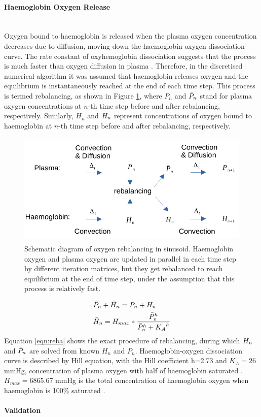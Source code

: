 \documentclass[12pt]{article}
\newcommand{\myparagraph}[1]{\paragraph{#1}\mbox{}\\}
\begin{document}
\myparagraph{Haemoglobin Oxygen Release}\label{section:haemo}
Oxygen bound to haemoglobin is released when the plasma oxygen concentration decreases due to diffusion, moving down the haemoglobin-oxygen dissociation curve. The rate constant of oxyhemoglobin dissociation suggests that the process is much faster than oxygen diffusion in plasma \cite{olsonMeasurementRateConstants2003}. Therefore, in the discretised numerical algorithm it was assumed that haemoglobin releases oxygen and the equilibrium is instantaneously reached at the end of each time step. This process is termed rebalancing, as shown in Figure \ref{fig:hemo}, where $P_n$ and $\Bar{P}_n$ stand for plasma oxygen concentrations at $n$-th time step before and after rebalancing, respectively. Similarly, $H_n$ and $\Bar{H}_n$ represent concentrations of oxygen bound to haemoglobin at $n$-th time step before and after rebalancing, respectively. 
\begin{figure}[h!]
\centering
\includegraphics[width = 12cm, height = 5.4cm]{hemo_sketch.png}
\caption{Schematic diagram of oxygen rebalancing in sinusoid. Haemoglobin oxygen and plasma oxygen are updated in parallel in each time step by different iteration matrices, but they get rebalanced to reach equilibrium at the end of time step, under the assumption that this process is relatively fast.}
\label{fig:hemo}
\end{figure}
\begin{equation}
\begin{aligned}
& \Bar{P}_n+\Bar{H}_n=P_n+H_n \\
& \Bar{H}_n=H_{max}*\frac{{\Bar{P}_n}^{h}}{{\Bar{P}_n}^{h}+{K_A}^{h}}\\
\end{aligned}
\label{eqn:reba}
\end{equation}
Equation \ref{eqn:reba} shows the exact procedure of rebalancing, during which $\Bar{H}_n$ and $\Bar{P}_n$ are solved from known $H_n$ and $P_n$. Haemoglobin-oxygen dissociation curve is described by Hill equation, with the Hill coefficient h=2.73 and $K_A=26$ mmHg, concentration of plasma oxygen with half of haemoglobin saturated \cite{valabregueRelationCerebralBlood2003}. $H_{max}=6865.67$ mmHg is the total concentration of haemoglobin oxygen when haemoglobin is 100\% saturated \cite{valabregueRelationCerebralBlood2003}.
\myparagraph{Validation}
\end{document}
